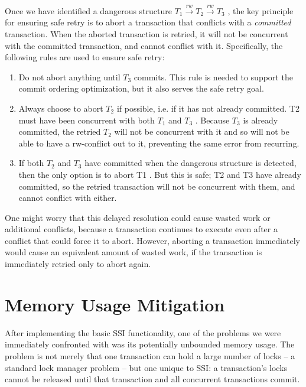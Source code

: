 \documentclass[11pt]{article}
\begin{document}
Once we have identified a dangerous structure \(T_1\xrightarrow{rw}T_2\xrightarrow{rw}T_3\) , the key
principle for ensuring safe retry is to abort a transaction that conflicts with a \emph{committed}
transaction. When the aborted transaction is retried, it will not be concurrent with the committed
transaction, and cannot conflict with it. Specifically, the following rules are used to ensure safe
retry:
\begin{enumerate}
\item Do not abort anything until \(T_3\) commits. This rule is needed to support the commit ordering
optimization, but it also serves the safe retry goal.
\item Always choose to abort \(T_2\) if possible, i.e. if it has not already committed. T2 must have been
concurrent with both \(T_1\) and \(T_3\) . Because \(T_3\) is already committed, the retried
\(T_2\) will not be concurrent with it and so will not be able to have a rw-conflict out to it,
preventing the same error from recurring.
\item If both \(T_2\) and \(T_3\) have committed when the dangerous structure is detected, then the only
option is to abort T1 . But this is safe; T2 and T3 have already committed, so the retried
transaction will not be concurrent with them, and cannot conflict with either.
\end{enumerate}


One might worry that this delayed resolution could cause wasted work or additional conflicts, because
a transaction continues to execute even after a conflict that could force it to abort. However,
aborting a transaction immediately would cause an equivalent amount of wasted work, if the transaction
is immediately retried only to abort again.
\section{Memory Usage Mitigation}
\label{sec:org7736f9b}
After implementing the basic SSI functionality, one of the problems we were immediately confronted
with was its potentially unbounded memory usage. The problem is not merely that one transaction can
hold a large number of locks – a standard lock manager problem – but one unique to SSI: a
transaction’s locks cannot be released until that transaction and all concurrent transactions commit.
\end{document}
